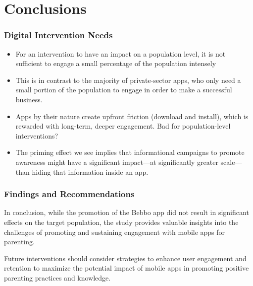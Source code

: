 \documentclass[aspectratio=169]{beamer}
\begin{document}
\section{Conclusions}


\begin{frame}
   \frametitle{Digital Intervention Needs}

   \begin{itemize}
   \item For an intervention to have an impact on a population level, it is not sufficient to engage a small percentage of the population intensely
   \item This is in contrast to the majority of private-sector apps, who only need a small portion of the population to engage in order to make a successful business.
   \item Apps by their nature create upfront friction (download and install), which is rewarded with long-term, deeper engagement. Bad for population-level interventions?
   \item The priming effect we see implies that informational campaigns to promote awareness might have a significant impact---at significantly greater scale---than hiding that information inside an app.
   \end{itemize}
\end{frame}


\begin{frame}
   \frametitle{Findings and Recommendations}

  In conclusion, while the promotion of the Bebbo app did not result in significant effects on the target population, the study provides valuable insights into the challenges of promoting and sustaining engagement with mobile apps for parenting.

Future interventions should consider strategies to enhance user engagement and retention to maximize the potential impact of mobile apps in promoting positive parenting practices and knowledge.
\end{frame}
\end{document}
